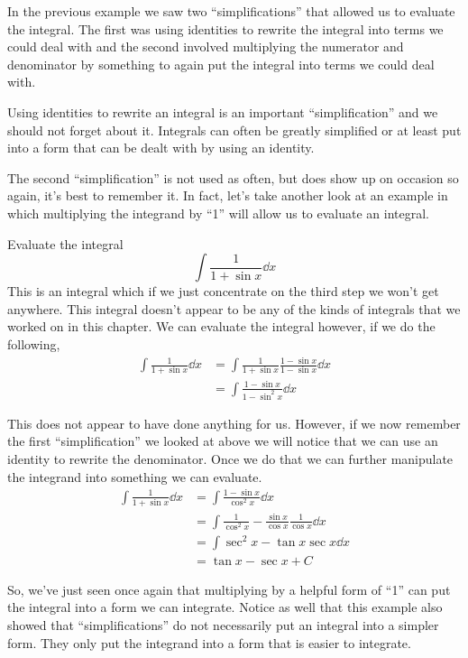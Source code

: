 In the previous example we saw two ``simplifications'' that allowed us to evaluate the integral. The first was using identities to rewrite the integral into terms we could deal with and the second involved multiplying the numerator and denominator by something to again put the integral into terms we could deal with.

Using identities to rewrite an integral is an important ``simplification'' and we should not forget about it. Integrals can often be greatly simplified or at least put into a form that can be dealt with by using an identity.

The second ``simplification'' is not used as often, but does show up on occasion so again, it's best to remember it. In fact, let's take another look at an example in which multiplying the integrand by ``1'' will allow us to evaluate an integral.

\begin{example}\label{ex_int_strat_sin}%
Evaluate the integral
\[\int \frac{1}{1+\sin x}\dd x\]
\solution
This is an integral which if we just concentrate on the third step we won't get anywhere. This integral doesn't appear to be any of the kinds of integrals that we worked on in this chapter. We can evaluate the integral however, if we do the following,
\begin{align*}
	\int \frac{1}{1+\sin x}\dd x
	&= \int \frac{1}{1+\sin x} \frac{1-\sin x}{1-\sin x}\dd x \\
	&= \int \frac{1-\sin x}{1-\sin^2 x}\dd x 
\end{align*}

This does not appear to have done anything for us. However, if we now remember the first ``simplification'' we looked at above we will notice that we can use an identity to rewrite the denominator. Once we do that we can further manipulate the integrand into something we can evaluate.
\begin{align*}
	\int \frac{1}{1+\sin x}\dd x
	&= \int \frac{1-\sin x}{\cos^2 x}\dd x \\
	&= \int \frac{1}{\cos^2 x} - \frac{\sin x}{\cos x}\frac{1}{\cos x}\dd x \\
	&= \int \sec^2 x - \tan x \sec x\dd x \\
	&= \tan x - \sec x +C
\end{align*}
\end{example}

So, we've just seen once again that multiplying by a helpful form of ``1'' can put the integral into a form we can integrate. Notice as well that this example also showed that ``simplifications'' do not necessarily put an integral into a simpler form. They only put the integrand into a form that is easier to integrate.

